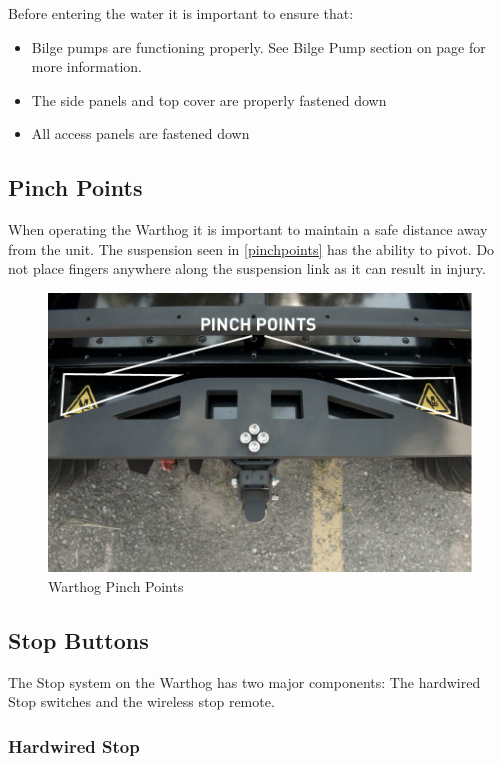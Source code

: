 \documentclass[]{clearpath-latex/clearpath-manual}
\begin{document}
Before entering the water it is important to ensure that:

\begin{itemize}[nolistsep]
  \item Bilge pumps are functioning properly.  See Bilge Pump section on page \pageref{bilgepumps} for more information.
  \item The side panels and top cover are properly fastened down
  \item All access panels are fastened down
\end{itemize}


\subsection{Pinch Points}

When operating the Warthog  it is important to maintain a safe distance away from the unit. The suspension seen in \autoref{pinchpoints} has the ability to pivot.  Do not place fingers anywhere along the suspension link as it can result in injury.

\begin{figure}[!htb]
  \centering
  \includegraphics[width=0.75\linewidth]{graphics/Warthog_pinch_points.jpg}
  \caption{Warthog Pinch Points}
  \label{pinchpoints}
\end{figure}

\pagebreak[4]
\subsection{Stop Buttons}

The Stop system on the Warthog has two major components: The hardwired Stop switches and the wireless stop remote.

\subsubsection{Hardwired Stop}
\end{document}
